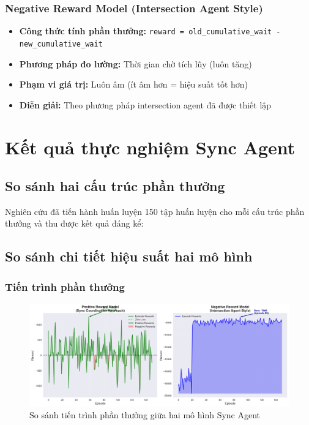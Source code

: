 \subsubsection{Negative Reward Model (Intersection Agent Style)}
\begin{itemize}
    \item \textbf{Công thức tính phần thưởng:} \texttt{reward = old\_cumulative\_wait -
        new\_cumulative\_wait}

    \item \textbf{Phương pháp đo lường:} Thời gian chờ tích lũy (luôn tăng)

    \item \textbf{Phạm vi giá trị:} Luôn âm (ít âm hơn = hiệu suất tốt hơn)

    \item \textbf{Diễn giải:}  Theo phương pháp intersection agent đã được
        thiết lập
\end{itemize}

\section{Kết quả thực nghiệm Sync Agent}

\subsection{So sánh hai cấu trúc phần thưởng}

Nghiên cứu đã tiến hành huấn luyện 150 tập huấn luyện cho mỗi cấu trúc phần thưởng và thu được
kết quả đáng kể:

\subsection{So sánh chi tiết hiệu suất hai mô hình}

\subsubsection{Tiến trình phần thưởng}

\begin{figure}[!htp]
    \centering
    \includegraphics[width=\textwidth]{figures/sync_reward_comparison.png}
    \caption{So sánh tiến trình phần thưởng giữa hai mô hình Sync Agent}
    \label{fig:sync_reward_comparison}
\end{figure}

